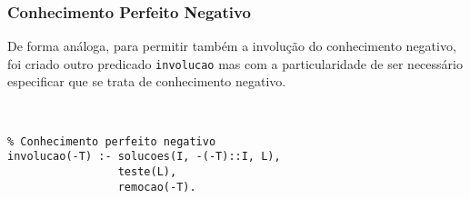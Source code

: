 \subsubsection{Conhecimento Perfeito Negativo}

De forma análoga, para permitir também a involução do conhecimento negativo, foi
criado outro predicado \texttt{involucao} mas com a particularidade de ser necessário especificar 
que se trata de conhecimento negativo.

\ 

\begin{lstlisting}[caption={Involução de Conhecimento Perfeito Negativo}]
% Extensao do meta-predicado involucao: T -> {V, F}
% Conhecimento perfeito negativo
involucao(-T) :- solucoes(I, -(-T)::I, L),
                 teste(L),
                 remocao(-T).
\end{lstlisting}
